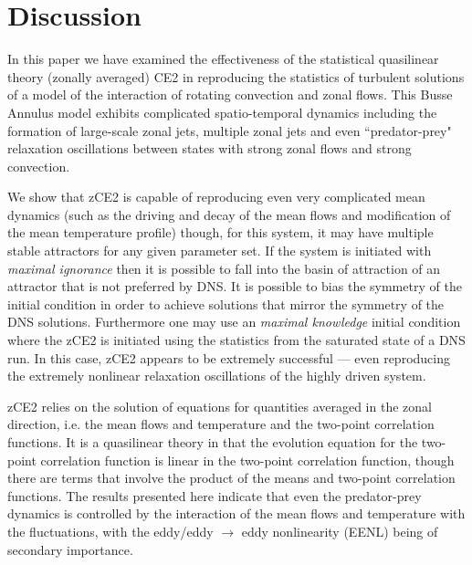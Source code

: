 \documentclass{jfm}
\begin{document}
\section{Discussion}
\label{sec:discussion}

In this paper we have examined the effectiveness of the statistical quasilinear theory (zonally averaged) CE2 in reproducing the statistics of turbulent solutions of a model of the interaction of rotating convection and zonal flows. This Busse Annulus model exhibits complicated spatio-temporal dynamics including the formation of large-scale zonal jets, multiple zonal jets and even ``predator-prey" relaxation oscillations between states with strong zonal flows and strong convection.

We show that zCE2 is capable of reproducing even very complicated mean dynamics (such as the driving and decay of the mean flows and modification of the mean temperature profile) though, for this system, it may have multiple stable attractors for any given parameter set. If the system is initiated with \textit{maximal ignorance} then it is possible to fall into the basin of attraction of an attractor that is not preferred by DNS. It is possible to bias the symmetry of the initial condition in order to achieve solutions that mirror the symmetry of the DNS solutions. Furthermore one may use an \textit{maximal knowledge} initial condition where the zCE2 is initiated using the statistics from the saturated state of a DNS run. In this case, zCE2 appears to be extremely successful --- even reproducing the extremely nonlinear relaxation oscillations of the highly driven system.

zCE2 relies on the solution of equations for quantities averaged in the zonal direction, i.e. the mean flows and temperature and the two-point correlation functions.  It is a quasilinear theory in that the evolution equation for the two-point correlation function 
is linear in the two-point correlation function, though there are terms that involve the product of the means and two-point correlation functions. The results presented here indicate that even the predator-prey dynamics is controlled by the interaction of the mean flows and temperature with the fluctuations, with the eddy/eddy $\rightarrow$ eddy nonlinearity (EENL) being of secondary importance. 
\end{document}
